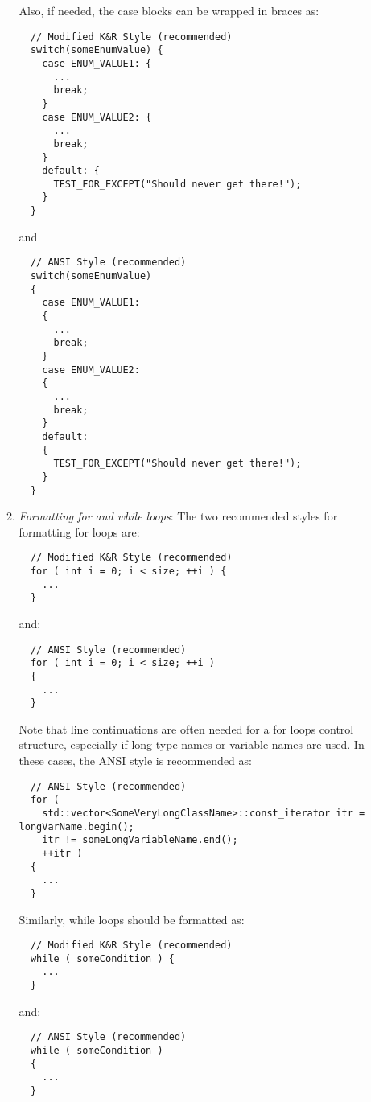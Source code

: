 \begin{enumerate}
\begin{enumerate}
  Also, if needed, the case blocks can be wrapped in braces as:

  {\small\begin{verbatim}
  // Modified K&R Style (recommended)
  switch(someEnumValue) {
    case ENUM_VALUE1: {
      ...
      break;
    }
    case ENUM_VALUE2: {
      ...
      break;
    }    
    default: {
      TEST_FOR_EXCEPT("Should never get there!");
    }
  }
  \end{verbatim}}

  {}\noindent{}and

  {\small\begin{verbatim}
  // ANSI Style (recommended)
  switch(someEnumValue)
  {
    case ENUM_VALUE1:
    {
      ...
      break;
    }
    case ENUM_VALUE2:
    {
      ...
      break;
    }    
    default:
    {
      TEST_FOR_EXCEPT("Should never get there!");
    }
  }
  \end{verbatim}}

  {}\item\textit{Formatting for and while loops}: The two recommended styles
  for formatting for loops are:

  {\small\begin{verbatim}
  // Modified K&R Style (recommended)
  for ( int i = 0; i < size; ++i ) {
    ...
  }
  \end{verbatim}}

  {}\noindent{}and:

  {\small\begin{verbatim}
  // ANSI Style (recommended)
  for ( int i = 0; i < size; ++i )
  {
    ...
  }
  \end{verbatim}}

  Note that line continuations are often needed for a for loops control
  structure, especially if long type names or variable names are used.  In
  these cases, the ANSI style is recommended as:

  {\small\begin{verbatim}
  // ANSI Style (recommended)
  for (
    std::vector<SomeVeryLongClassName>::const_iterator itr = longVarName.begin();
    itr != someLongVariableName.end();
    ++itr )
  {
    ...
  }
  \end{verbatim}}

  Similarly, while loops should be formatted as:

  {\small\begin{verbatim}
  // Modified K&R Style (recommended)
  while ( someCondition ) {
    ...
  }
  \end{verbatim}}

  {}\noindent{}and:

  {\small\begin{verbatim}
  // ANSI Style (recommended)
  while ( someCondition )
  {
    ...
  }
  \end{verbatim}}

  \end{enumerate}

\end{enumerate}

